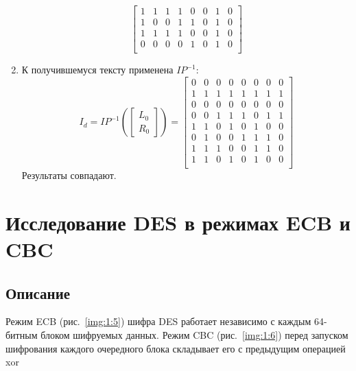 \documentclass[a4paper, 14pt]{extarticle}
\begin{document}
\begin{enumerate}
\begin{equation}
\begin{bmatrix}
            1   & 1   & 1   & 1   & 0   & 0   & 1   & 0   \\
            1   & 0   & 0   & 1   & 1   & 0   & 1   & 0   \\
            1   & 1   & 1   & 1   & 0   & 0   & 1   & 0   \\
            0   & 0   & 0   & 0   & 1   & 0   & 1   & 0   \\
        \end{bmatrix}
    \end{equation}
    \item К получившемуся тексту применена $IP^{-1}$:
    \begin{equation}
        I_d = IP^{-1}\left( \begin{bmatrix}
            L_0 \\ R_0
        \end{bmatrix} \right) = \begin{bmatrix}
            0   & 0   & 0   & 0   & 0   & 0   & 0   & 0   \\
            1   & 1   & 1   & 1   & 1   & 1   & 1   & 1   \\
            0   & 0   & 0   & 0   & 0   & 0   & 0   & 0   \\
            0   & 0   & 1   & 1   & 1   & 0   & 1   & 1   \\
            1   & 1   & 0   & 1   & 0   & 1   & 0   & 0   \\
            0   & 1   & 0   & 0   & 1   & 1   & 1   & 0   \\
            1   & 1   & 1   & 0   & 0   & 1   & 1   & 0   \\
            1   & 1   & 0   & 1   & 0   & 1   & 0   & 0   \\
        \end{bmatrix}
    \end{equation}
    Результаты совпадают.
\end{enumerate}

\section{Исследование DES в режимах ECB и CBC}
\subsection{Описание}
Режим ECB (рис.~\ref{img:1:5}) шифра DES работает независимо с каждым 64-битным блоком шифруемых данных. Режим CBC (рис.~\ref{img:1:6}) перед запуском шифрования каждого очередного блока складывает его с предыдущим операцией xor
\end{document}
